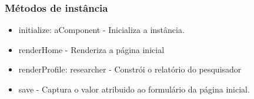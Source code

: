 \subsubsection{Métodos de instância}

\begin{itemize}
  \item initialize: aComponent - Inicializa a instância.

  \item renderHome - Renderiza a página inicial

  \item renderProfile: researcher - Constrói o relatório do pesquisador

  \item save - Captura o valor atribuido ao formulário da página inicial.

\end{itemize}
